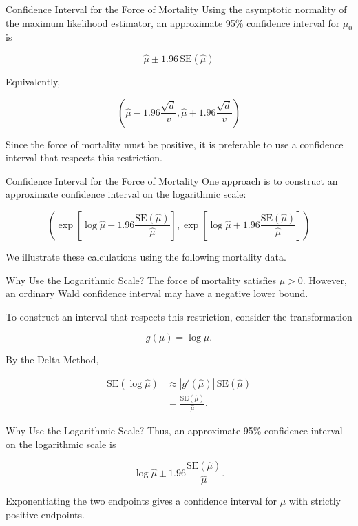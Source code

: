 \documentclass[
  ignorenonframetext,
  aspectratio=169,
]{beamer}
\begin{document}
\begin{frame}{Confidence Interval for the Force of Mortality}
\protect{}\label{confidence-interval-for-the-force-of-mortality}
Using the asymptotic normality of the maximum likelihood estimator, an
approximate 95\% confidence interval for \(\mu_0\) is

\[
\boxed{
\hat{\mu}
\pm 1.96\,\mathrm{SE}(\hat{\mu})
}
\]

Equivalently,

\[
\boxed{
\left(
\hat{\mu}-1.96\frac{\sqrt{d}}{v},
\hat{\mu}+1.96\frac{\sqrt{d}}{v}
\right)
}
\]

Since the force of mortality must be positive, it is preferable to use a
confidence interval that respects this restriction.
\end{frame}

\begin{frame}{Confidence Interval for the Force of Mortality}
\protect{}\label{confidence-interval-for-the-force-of-mortality-1}
One approach is to construct an approximate confidence interval on the
logarithmic scale:

\[
\boxed{
\left(
\exp\left[\log\hat{\mu}
-1.96\frac{\mathrm{SE}(\hat{\mu})}{\hat{\mu}}\right],
\exp\left[\log\hat{\mu}
+1.96\frac{\mathrm{SE}(\hat{\mu})}{\hat{\mu}}\right]
\right)
}
\]

We illustrate these calculations using the following mortality data.
\end{frame}

\begin{frame}{Why Use the Logarithmic Scale?}
\protect{}\label{why-use-the-logarithmic-scale}
The force of mortality satisfies \(\mu>0\). However, an ordinary Wald
confidence interval may have a negative lower bound.

To construct an interval that respects this restriction, consider the
transformation

\[
g(\mu)=\log\mu.
\]

By the Delta Method,

\[
\begin{aligned}
\mathrm{SE}(\log\hat{\mu})
&\approx |g'(\hat{\mu})|\,
\mathrm{SE}(\hat{\mu})\\
&=\frac{\mathrm{SE}(\hat{\mu})}{\hat{\mu}}.
\end{aligned}
\]
\end{frame}

\begin{frame}{Why Use the Logarithmic Scale?}
\protect{}\label{why-use-the-logarithmic-scale-1}
Thus, an approximate 95\% confidence interval on the logarithmic scale
is

\[
\log\hat{\mu}
\pm 1.96\frac{\mathrm{SE}(\hat{\mu})}{\hat{\mu}}.
\]

Exponentiating the two endpoints gives a confidence interval for \(\mu\)
with strictly positive endpoints.
\end{frame}
\end{document}
